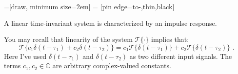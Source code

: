 =[draw, minimum size=2em]
 = [pin edge={to-,thin,black}]

\begin{marginfigure}
  \begin{center}


  \end{center}
  \caption{A linear time-invariant system is characterized by an impulse response.}
\end{marginfigure}

You may recall that linearity of the system $\mathcal{T}\{\cdot\}$ implies that:
\begin{equation}
  \mathcal{T}\{c_1 \delta(t-\tau_1) + c_2 \delta(t-\tau_2)\} = c_1 \mathcal{T}\{\delta(t-\tau_1)\}+ c_2 \mathcal{T}\{\delta(t-\tau_2)\}\,\,.
\end{equation}
Here I've used $\delta(t-\tau_1)$ and $\delta(t-\tau_2)$ as two different input signals. 
The terms $c_1,c_2\in \mathbb{C}$ are arbitrary complex-valued constants.

